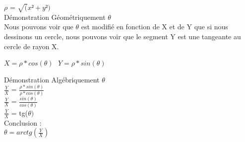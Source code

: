 $\rho$ = $\sqrt(x²+y²)$ \\

Démonstration Géométriquement $\theta$ \\

Nous pouvons voir que $\theta$ est modifié en fonction de X et de Y que si nous dessinons un cercle, nous pouvons voir que le segment Y est une tangeante au cercle de rayon X. \\


$X=\rho * cos(\theta)$ $ $ $ Y=\rho * sin(\theta)$

\vspace{5mm} %
Démonstration Algébriquement $\theta$ \\

$\frac{Y}{X}$ = $\frac{\rho * sin(\theta)}{\rho * cos(\theta)}$ \\
$\frac{Y}{X}$ = $\frac{sin(\theta)}{cos(\theta)}$ \\
$\frac{Y}{X}$ = tg($\theta)$ \\

\vspace{5mm} %
Conclusion : \\

$\theta = arctg(\frac{Y}{X})$
